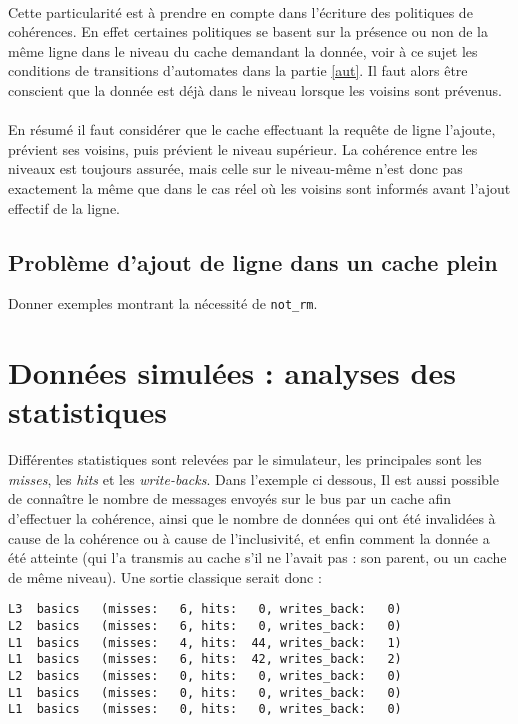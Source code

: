 \paragraph{}
Cette particularité est à prendre en compte dans l'écriture des politiques de cohérences. En effet certaines politiques se basent sur la présence ou non de la même ligne dans le niveau du cache demandant la donnée, voir à ce sujet les conditions de transitions d'automates dans la partie \ref{aut}. Il faut alors être conscient que la donnée est déjà dans le niveau lorsque les voisins sont prévenus.

\paragraph{}
En résumé il faut considérer que le cache effectuant la requête de ligne l'ajoute, prévient ses voisins, puis prévient le niveau supérieur. La cohérence entre les niveaux est toujours assurée, mais celle sur le niveau-même n'est donc pas exactement la même que dans le cas réel où les voisins sont informés avant l'ajout effectif de la ligne.


\subsection{Problème d'ajout de ligne dans un cache plein}


Donner exemples montrant la nécessité de \verb:not_rm:.

\section{Données simulées : analyses des statistiques}

Différentes statistiques sont relevées par le simulateur, les principales sont les \emph{misses}, les \emph{hits} et les \emph{write-backs}. Dans l'exemple ci dessous, Il est aussi possible de connaître le nombre de messages envoyés sur le bus par un cache afin d'effectuer la cohérence, ainsi que le nombre de données qui ont été invalidées à cause de la cohérence ou à cause de l'inclusivité, et enfin comment la donnée a été atteinte (qui l'a transmis au cache s'il ne l'avait pas : son parent, ou un cache de même niveau). Une sortie classique serait donc :

\begin{lstlisting}
L3  basics   (misses:   6, hits:   0, writes_back:   0)
L2  basics   (misses:   6, hits:   0, writes_back:   0)
L1  basics   (misses:   4, hits:  44, writes_back:   1)
L1  basics   (misses:   6, hits:  42, writes_back:   2)
L2  basics   (misses:   0, hits:   0, writes_back:   0)
L1  basics   (misses:   0, hits:   0, writes_back:   0)
L1  basics   (misses:   0, hits:   0, writes_back:   0)
\end{lstlisting}



